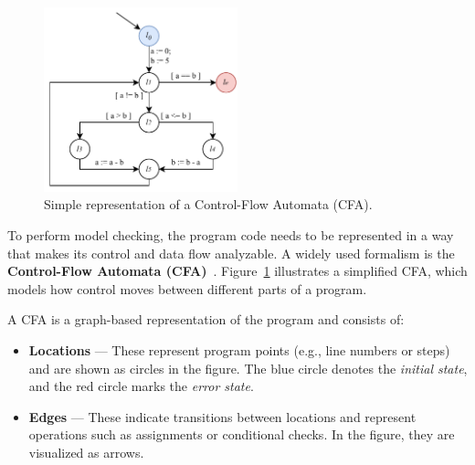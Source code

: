 \begin{figure}
  \centering
  \includegraphics[width=0.5\textwidth]{figures/cfa_simple.drawio.pdf}
  \caption{Simple representation of a Control-Flow Automata (CFA). }
  \label{fig:cfa}
\end{figure}



To perform model checking, the program code needs to be represented in a way that makes its control and data flow analyzable. A widely used formalism is the \textbf{Control-Flow Automata (CFA)}~\cite{cfa}. Figure~\ref{fig:cfa} illustrates a simplified CFA, which models how control moves between different parts of a program.

A CFA is a graph-based  representation of the program and consists of:
\begin{itemize}
  \item \textbf{Locations} — These represent program points (e.g., line numbers or steps) and are shown as circles in the figure. The blue circle denotes the \textit{initial state}, and the red circle marks the \textit{error state}.
  \item \textbf{Edges} — These indicate transitions between locations and represent operations such as assignments or conditional checks. In the figure, they are visualized as arrows.
\end{itemize}

